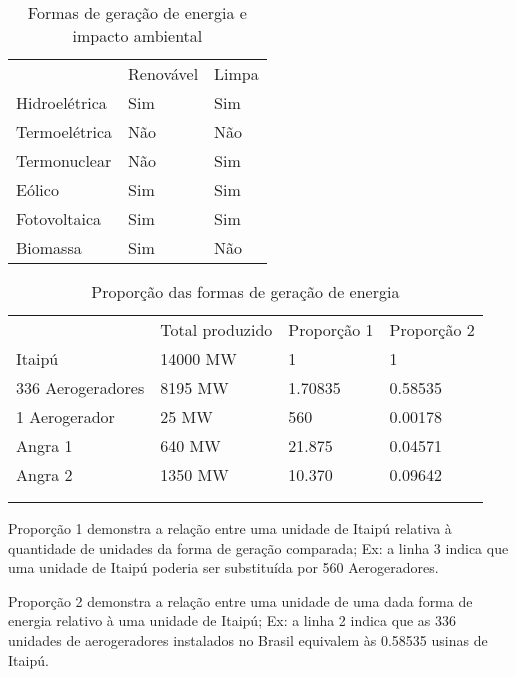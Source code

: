 \documentclass[
   article,       %
   12pt,          %
   oneside,       %
   a4paper,       %
   english,       %
   brazil,           %
   sumario=tradicional
   ]{abntex2}
\begin{document}

\frenchspacing 

\maketitle

\textual

\newpage

\begin{table}
\centering
\caption{Formas de geração de energia e impacto ambiental}
\begin{tabular}{lll}
              & Renovável & Limpa  \\
Hidroelétrica & Sim       & Sim    \\
Termoelétrica & Não       & Não    \\
Termonuclear  & Não       & Sim    \\
Eólico        & Sim       & Sim    \\
Fotovoltaica  & Sim       & Sim    \\
Biomassa      & Sim       & Não   
\end{tabular}
\end{table}


\begin{table}
\centering
\caption{Proporção das formas de geração de energia}
\begin{tabular}{llll}
                  & Total produzido & Proporção 1  & Proporção 2  \\
Itaipú            & 14000 MW        & 1            & 1            \\
336 Aerogeradores & 8195 MW         & 1.70835      & 0.58535      \\
1 Aerogerador     & 25 MW           & 560          & 0.00178      \\
Angra 1           & 640 MW          & 21.875       & 0.04571      \\
Angra 2           & 1350 MW         & 10.370       & 0.09642      \\
                  &                 &              &              \\
                  &                 &              &             
\end{tabular}
\end{table}

Proporção 1 demonstra a relação entre uma unidade de Itaipú relativa à quantidade de unidades da forma de geração comparada; Ex: a linha 3 indica que uma unidade de Itaipú poderia ser substituída por 560 Aerogeradores.

Proporção 2 demonstra a relação entre uma unidade de uma dada forma de energia relativo à uma unidade de Itaipú; Ex: a linha 2 indica que as 336 unidades de aerogeradores instalados no Brasil equivalem às 0.58535 usinas de Itaipú.

\postextual

\newpage


\end{document}
